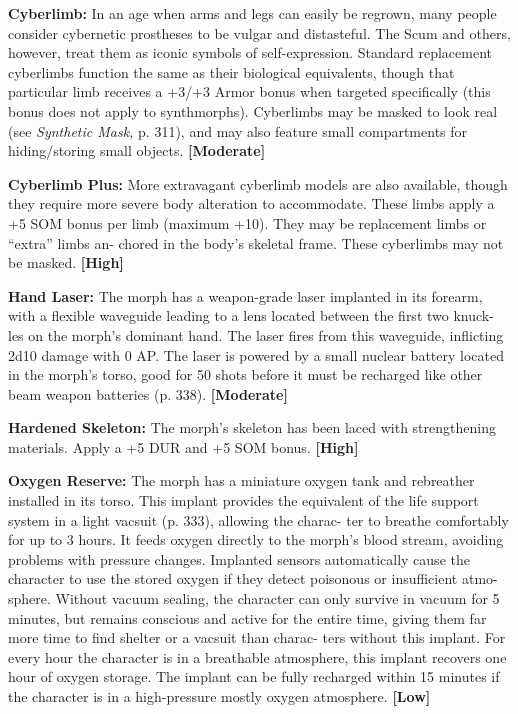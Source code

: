 \textbf{Cyberlimb:} In an age when arms and legs can 
easily be regrown, many people consider cybernetic 
prostheses to be vulgar and distasteful. The Scum 
and others, however, treat them as iconic symbols 
of self-expression. Standard replacement cyberlimbs 
function the same as their biological equivalents, 
though that particular limb receives a +3/+3 Armor 
bonus when targeted specifically (this bonus does not 
apply to synthmorphs). Cyberlimbs may be masked 
to look real (see \textit{Synthetic Mask,} p. 311), and may 
also feature small compartments for hiding/storing 
small objects. \textbf{[Moderate]}

\textbf{Cyberlimb Plus:} More extravagant cyberlimb 
models are also available, though they require more 
severe body alteration to accommodate. These limbs 
apply a +5 SOM bonus per limb (maximum +10). 
They may be replacement limbs or ``extra'' limbs an-
chored in the body's skeletal frame. These cyberlimbs 
may not be masked. \textbf{[High]}

\textbf{Hand Laser: }The morph has a weapon-grade laser 
implanted in its forearm, with a flexible waveguide 
leading to a lens located between the first two knuck-
les on the morph's dominant hand. The laser fires 
from this waveguide, inflicting 2d10 damage with 0 
AP. The laser is powered by a small nuclear battery 
located in the morph's torso, good for 50 shots before 
it must be recharged like other beam weapon batteries 
(p. 338). \textbf{[Moderate]}

\textbf{Hardened Skeleton: }The morph's skeleton has been 
laced with strengthening materials. Apply a +5 DUR 
and +5 SOM bonus. \textbf{[High]}

\textbf{Oxygen Reserve: }The morph has a miniature 
oxygen tank and rebreather installed in its torso. This 
implant provides the equivalent of the life support 
system in a light vacsuit (p. 333), allowing the charac-
ter to breathe comfortably for up to 3 hours. It feeds 
oxygen directly to the morph's blood stream, avoiding 
problems with pressure changes. Implanted sensors 
automatically cause the character to use the stored 
oxygen if they detect poisonous or insufficient atmo-
sphere. Without vacuum sealing, the character can 
only survive in vacuum for 5 minutes, but remains 
conscious and active for the entire time, giving them 
far more time to find shelter or a vacsuit than charac-
ters without this implant. For every hour the character 
is in a breathable atmosphere, this implant recovers 
one hour of oxygen storage. The implant can be fully 
recharged within 15 minutes if the character is in a 
high-pressure mostly oxygen atmosphere. \textbf{[Low]}

